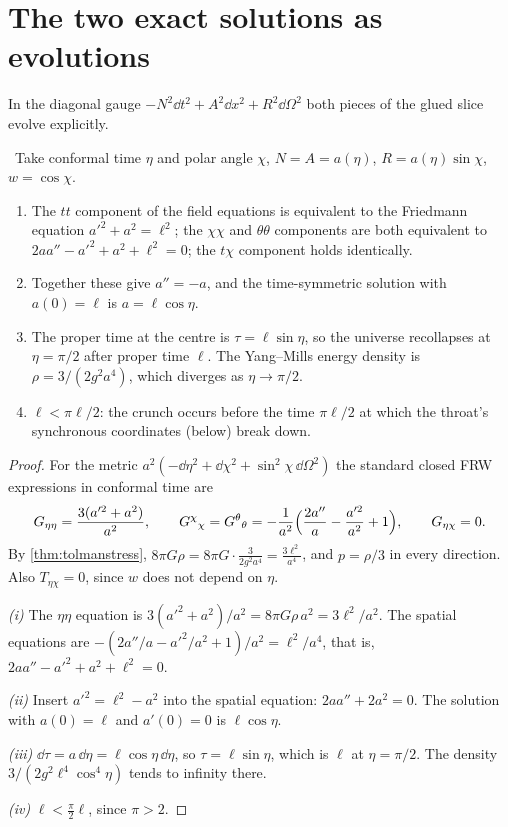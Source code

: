\section{The two exact solutions as evolutions}

In the diagonal gauge $-N^2\dd t^2+A^2\dd x^2+R^2\dd\Omega^2$ both pieces of the glued slice evolve explicitly.

\begin{theorem}\label{thm:tolmanevo}\ver\
Take conformal time $\eta$ and polar angle $\chi$, $N=A=a(\eta)$, $R=a(\eta)\sin\chi$, $w=\cos\chi$.
\begin{enumerate}[label=(\roman*)]
\item The $tt$ component of the field equations is equivalent to the Friedmann equation $a'^2+a^2=\ell^2$; the $\chi\chi$ and $\theta\theta$ components are both equivalent to $2aa''-a'^2+a^2+\ell^2=0$; the $t\chi$ component holds identically.
\item Together these give $a''=-a$, and the time-symmetric solution with $a(0)=\ell$ is $a=\ell\cos\eta$.
\item The proper time at the centre is $\tau=\ell\sin\eta$, so the universe recollapses at $\eta=\pi/2$ after proper time $\ell$. The Yang--Mills energy density is $\rho=3/(2g^2a^4)$, which diverges as $\eta\to\pi/2$.
\item $\ell<\pi\ell/2$: the crunch occurs before the time $\pi\ell/2$ at which the throat's synchronous coordinates (below) break down.
\end{enumerate}
\end{theorem}
\begin{proof}
For the metric $a^2(-\dd\eta^2+\dd\chi^2+\sin^2\chi\,\dd\Omega^2)$ the standard closed FRW expressions in conformal time are
\[
G_{\eta\eta}=\frac{3(a'^2+a^2)}{a^2},\qquad G^\chi{}_\chi=G^\theta{}_\theta=-\frac1{a^2}\Bigl(\frac{2a''}a-\frac{a'^2}{a^2}+1\Bigr),\qquad G_{\eta\chi}=0 .
\]
By \cref{thm:tolmanstress}, $8\pi G\rho=8\pi G\cdot\frac3{2g^2a^4}=\frac{3\ell^2}{a^4}$, and $p=\rho/3$ in every direction. Also $T_{\eta\chi}=0$, since $w$ does not depend on $\eta$.

\emph{(i)} The $\eta\eta$ equation is $3(a'^2+a^2)/a^2=8\pi G\rho\,a^2=3\ell^2/a^2$. The spatial equations are $-(2a''/a-a'^2/a^2+1)/a^2=\ell^2/a^4$, that is, $2aa''-a'^2+a^2+\ell^2=0$.

\emph{(ii)} Insert $a'^2=\ell^2-a^2$ into the spatial equation: $2aa''+2a^2=0$. The solution with $a(0)=\ell$ and $a'(0)=0$ is $\ell\cos\eta$.

\emph{(iii)} $\dd\tau=a\,\dd\eta=\ell\cos\eta\,\dd\eta$, so $\tau=\ell\sin\eta$, which is $\ell$ at $\eta=\pi/2$. The density $3/(2g^2\ell^4\cos^4\eta)$ tends to infinity there.

\emph{(iv)} $\ell<\frac\pi2\ell$, since $\pi>2$.
\end{proof}


